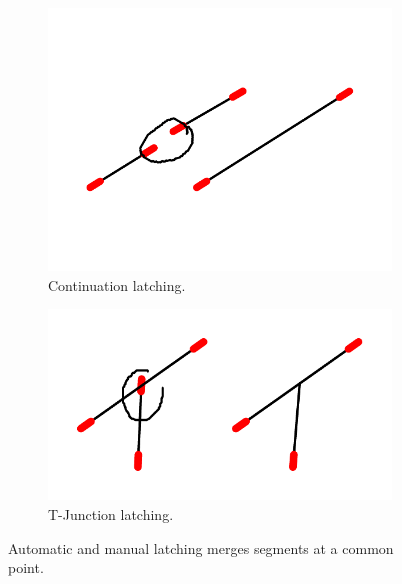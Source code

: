 \begin{figure}
  \vspace{5mm}
  \begin{subfigure}[t]{0.45\textwidth}
    \centering
    \includegraphics[width=0.6\linewidth]{img/latch-manual-continuation.pdf}
    \caption{Continuation latching.}
    \label{fig:latch-continuation}
  \end{subfigure}
  \begin{subfigure}[t]{0.45\textwidth}
    \centering
    \includegraphics[width=0.6\linewidth]{img/latch-manual-tjunct.pdf}
    \caption{T-Junction latching.}
    \label{fig:latch-tjunct}
  \end{subfigure}
  \caption[Four Kinds of Latching]{Automatic and manual latching
    merges segments at a common point.}
  \label{fig:latch}
\end{figure}



